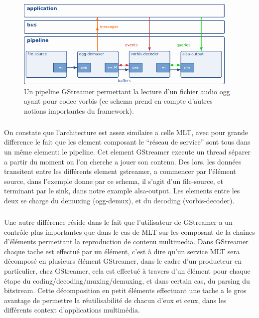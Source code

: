 \begin{figure} [H]

  \begin{center}

    \includegraphics[width=0.95\textwidth]{images/gstpipeline}

  \end{center}

  \caption{Un pipeline GStreamer permettant la lecture d'un fichier
  audio ogg
    ayant pour codec vorbis (ce schema prend en compte d'autres notions
    importantes du framework).}

  \label{Yes}

\end{figure}

\subparagraph{}

On constate que l'architecture est assez similaire a celle MLT, avec
pour grande difference le fait que les element composant le ``réseau
de service'' sont tous dans un même element: le pipeline. Cet element
GStreamer execute un thread séparer a partir du moment ou l'on cherche a
jouer son contenu. Des lors, les données transitent entre les différents
element gstreamer, a commencer par l'élément source, dans l'exemple
donne par ce schema, il s'agit d'un file-source, et terminant par le
sink, dans notre example alsa-output. Les elements entre les deux se
charge du demuxing (ogg-demux), et du decoding (vorbis-decoder).

\subparagraph{}

Une autre différence réside dans le fait que l'utilisateur de
GStreamer a un contrôle plus importantes que dans le cas de MLT sur
les composant de la chaines d'éléments permettant la reproduction de
contenu multimedia.  Dans GStreamer chaque tache est effectué par un
élément, c'est à dire qu'un service MLT sera décomposé en plusieurs
élément GStreamer, dans le cadre d'un producteur en particulier, chez
GStreamer, cela est effectué à travers d'un élément pour chaque étape
du coding/decoding/muxing/demuxing, et dans certain cas, du parsing du
bitstream. Cette décomposition en petit éléments effectuant une tache
a le gros avantage de permettre la réutilisabilité de chacun d'eux et
ceux, dans les différents  context d'applications multimédia.

